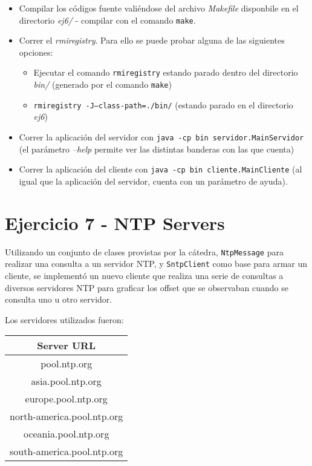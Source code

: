 \begin{itemize}
    \item Compilar los códigos fuente valiéndose del archivo \emph{Makefile} disponbile en el directorio \emph{ej6/} - compilar con el comando \texttt{make}.
    \item Correr el \emph{rmiregistry}. Para ello se puede probar alguna de las siguientes opciones:
    \begin{itemize}
        \item Ejecutar el comando \texttt{rmiregistry} estando parado dentro del directorio \emph{bin/} (generado por el comando \texttt{make})  
        \item \texttt{rmiregistry -J--class-path=./bin/} (estando parado en el directorio \emph{ej6})
    \end{itemize}
    \item Correr la aplicación del servidor con \texttt{java -cp bin servidor.MainServidor} (el parámetro \emph{--help} permite ver las distintas banderas con las que cuenta) 
    \item Correr la aplicación del cliente con \texttt{java -cp bin cliente.MainCliente} (al igual que la aplicación del servidor, cuenta con un parámetro de ayuda). 
\end{itemize}

\section{Ejercicio 7 - NTP Servers}

Utilizando un conjunto de clases provistas por la cátedra, \texttt{NtpMessage} para realizar una consulta a un servidor NTP, y \texttt{SntpClient} como base para armar un cliente,  se implementó un nuevo cliente que realiza una serie de consultas a diversos servidores NTP para graficar los offset que se observaban cuando se consulta uno u otro servidor.

Los servidores utilizados fueron:

\begin{center}
    \begin{tabular}{ c }
        \textbf{Server URL} \\
        \hline
        \hline
        pool.ntp.org \\ 
        asia.pool.ntp.org \\
        europe.pool.ntp.org \\
        north-america.pool.ntp.org \\
        oceania.pool.ntp.org \\ 
        south-america.pool.ntp.org \\ 
    \end{tabular}
\end{center}

